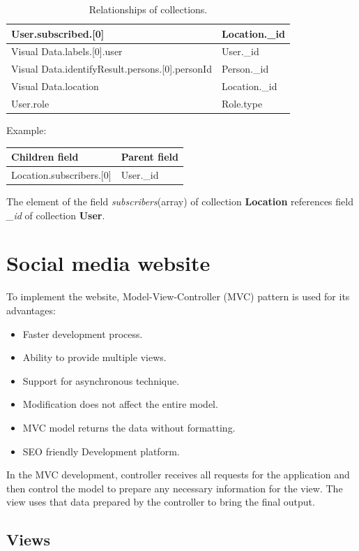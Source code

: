 \begin{table}[H]
\begin{tabular}{|l|l|}
		User.subscribed.{[}0{]}                             & Location.\_id         \\ \hline
		Visual Data.labels.{[}0{]}.user                     & User.\_id             \\ \hline
		Visual Data.identifyResult.persons.{[}0{]}.personId & Person.\_id           \\ \hline
		Visual Data.location                                & Location.\_id         \\ \hline
		User.role                                           & Role.type             \\ \hline
	\end{tabular}
	\caption{Relationships of collections.}
\end{table}
\cleardoublepage
Example:
\begin{table}[H]
	\begin{tabular}{|l|l|}
		\hline
		Children field               & Parent field \\ \hline
		Location.subscribers.{[}0{]} & User.\_id    \\ \hline
	\end{tabular}
\end{table}
The element of the field \textit{subscribers}(array) of collection \textbf{Location} references field \textit{\_id} of collection \textbf{User}.
\section{Social media website}
To implement the website, Model-View-Controller (MVC) pattern is used for its advantages:
\begin{itemize}
\item Faster development process.
\item Ability to provide multiple views.
\item Support for asynchronous technique.
\item Modification does not affect the entire model.
\item MVC model returns the data without formatting.
\item SEO friendly Development platform.
\end{itemize}
In the MVC development, controller receives all requests for the application and then control the model to prepare any necessary information for the view. The view uses that data prepared by the controller to bring the final output.
\subsection{Views}
